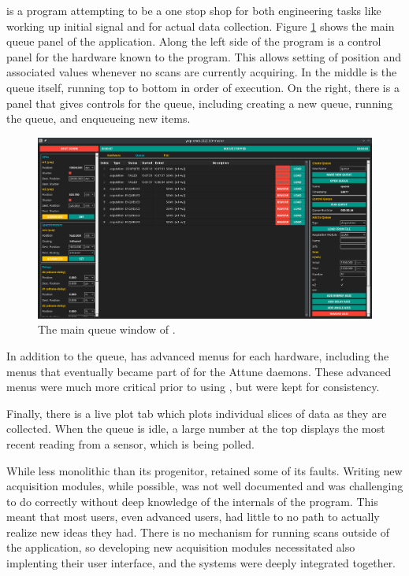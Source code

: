 \yaqccmds{} is a program attempting to be a one stop shop for both engineering tasks like working up initial signal and for actual data collection.
Figure \ref{acq:fig:yaqccmds} shows the main queue panel of the application.
Along the left side of the program is a control panel for the hardware known to the program.
This allows setting of position and associated values whenever no scans are currently acquiring.
In the middle is the queue itself, running top to bottom in order of execution.
On the right, there is a panel that gives controls for the queue, including creating a new queue, running the queue, and enqueueing new items.

\begin{landscape}
\begin{figure}
\includegraphics[width=9in]{"acquisition/images/yaqc-cmds"}
\caption[yaqc-cmds]{
	The main queue window of \yaqccmds{}.
}
\label{acq:fig:yaqccmds}
\end{figure}
\end{landscape}

In addition to the queue, \yaqccmds{} has advanced menus for each hardware, including the menus that eventually became part of \yaqcqtpy{} for the Attune daemons.
These advanced menus were much more critical prior to using \yaq{}, but were kept for consistency.

Finally, there is a live plot tab which plots individual slices of data as they are collected.
When the queue is idle, a large number at the top displays the most recent reading from a sensor, which is being polled.

While less monolithic than its progenitor, \yaqccmds{} retained some of its faults.
Writing new acquisition modules, while possible, was not well documented and was challenging to do correctly without deep knowledge of the internals of the program.
This meant that most users, even advanced users, had little to no path to actually realize new ideas they had.
There is no mechanism for running scans outside of the application, so developing new acquisition modules necessitated also implenting their user interface, and the systems were deeply integrated together.


